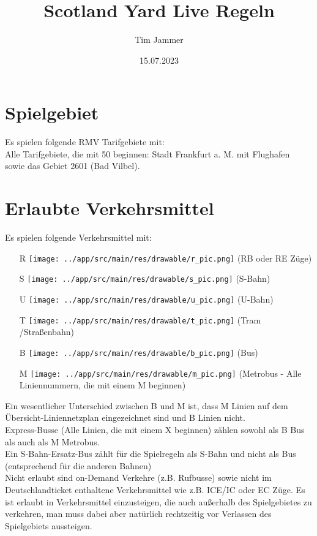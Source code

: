 \documentclass[12pt,a4paper]{article}
\title{Scotland Yard Live Regeln}
\author{Tim Jammer}
\date{15.07.2023}
\begin{document}
\maketitle


\section{Spielgebiet}
Es spielen folgende RMV Tarifgebiete mit:\\
Alle Tarifgebiete, die mit 50 beginnen: Stadt Frankfurt a. M. mit Flughafen\\
sowie das Gebiet 2601 (Bad Vilbel).

\section{Erlaubte Verkehrsmittel}
Es spielen folgende Verkehrsmittel mit:
\begin{itemize}
	\item[R] {\texttt{[image: ../app/src/main/res/drawable/r\_pic.png]}} (RB oder RE Züge)
	\item[S] {\texttt{[image: ../app/src/main/res/drawable/s\_pic.png]}} (S-Bahn)
	\item[U] {\texttt{[image: ../app/src/main/res/drawable/u\_pic.png]}} (U-Bahn)
	\item[T] {\texttt{[image: ../app/src/main/res/drawable/t\_pic.png]}} (Tram /Straßenbahn)
	\item[B] {\texttt{[image: ../app/src/main/res/drawable/b\_pic.png]}} (Bus)
	\item[M] {\texttt{[image: ../app/src/main/res/drawable/m\_pic.png]}} (Metrobus - Alle Liniennummern, die mit einem M beginnen)
\end{itemize}
Ein wesentlicher Unterschied zwischen B und M ist, dass M Linien auf dem Übersicht-Liniennetzplan eingezeichnet sind und B Linien nicht.\\
Express-Busse (Alle Linien, die mit einem X beginnen) zählen sowohl als B Bus als auch als M Metrobus.\\
Ein S-Bahn-Ersatz-Bus zählt für die Spielregeln als S-Bahn und nicht als Bus (entsprechend für die anderen Bahnen)
\\
Nicht erlaubt sind on-Demand Verkehre (z.B. Rufbusse) sowie nicht im Deutschlandticket enthaltene Verkehrsmittel wie z.B. ICE/IC oder EC Züge.
Es ist erlaubt in Verkehrsmittel einzusteigen, die auch außerhalb des Spielgebietes zu verkehren, man muss dabei aber natürlich rechtzeitig vor Verlassen des Spielgebiets aussteigen.
\end{document}
